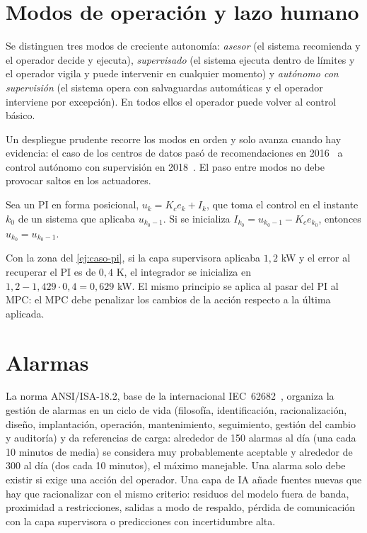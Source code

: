 \section{Modos de operación y lazo humano}

\begin{definicion}\label{def:modos}
Se distinguen tres modos de creciente autonomía: \emph{asesor} (el sistema recomienda y el operador decide y ejecuta), \emph{supervisado} (el sistema ejecuta dentro de límites y el operador vigila y puede intervenir en cualquier momento) y \emph{autónomo con supervisión} (el sistema opera con salvaguardas automáticas y el operador interviene por excepción). En todos ellos el operador puede volver al control básico.
\end{definicion}

Un despliegue prudente recorre los modos en orden y solo avanza cuando hay evidencia: el caso de los centros de datos pasó de recomendaciones en 2016~\cite{evansgao} a control autónomo con supervisión en 2018~\cite{gamblegao}. El paso entre modos no debe provocar saltos en los actuadores.

\begin{proposicion}\label{prop:bumpless}
Sea un PI en forma posicional, $u_k=K_ce_k+I_k$, que toma el control en el instante $k_0$ de un sistema que aplicaba $u_{k_0-1}$. Si se inicializa $I_{k_0}=u_{k_0-1}-K_ce_{k_0}$, entonces $u_{k_0}=u_{k_0-1}$.
\end{proposicion}

Con la zona del \cref{ej:caso-pi}, si la capa supervisora aplicaba $1{,}2$ kW y el error al recuperar el PI es de $0{,}4$ K, el integrador se inicializa en $1{,}2-1{,}429\cdot0{,}4=0{,}629$ kW. El mismo principio se aplica al pasar del PI al MPC: el MPC debe penalizar los cambios de la acción respecto a la última aplicada.

\section{Alarmas}

La norma ANSI/ISA-18.2, base de la internacional IEC~62682~\cite{isa182}, organiza la gestión de alarmas en un ciclo de vida (filosofía, identificación, racionalización, diseño, implantación, operación, mantenimiento, seguimiento, gestión del cambio y auditoría) y da referencias de carga: alrededor de 150 alarmas al día (una cada 10 minutos de media) se considera muy probablemente aceptable y alrededor de 300 al día (dos cada 10 minutos), el máximo manejable. Una alarma solo debe existir si exige una acción del operador. Una capa de IA añade fuentes nuevas que hay que racionalizar con el mismo criterio: residuos del modelo fuera de banda, proximidad a restricciones, salidas a modo de respaldo, pérdida de comunicación con la capa supervisora o predicciones con incertidumbre alta.

